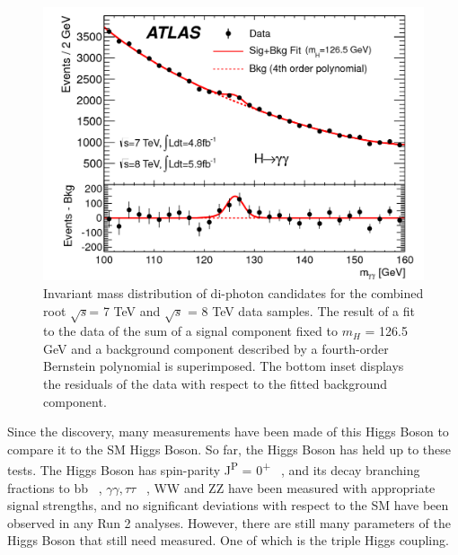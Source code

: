 \begin{figure}[h]
\begin{center}
\includegraphics[scale=0.25]{figures/higgs_disc}
\caption[Higgs boson mass peak]{Invariant mass distribution of di-photon candidates for the combined root $\sqrt{s}$= 7 TeV and $\sqrt{s}$ = 8 TeV data samples. The result of a fit to the data of the sum of a signal component fixed to $m_{H}$ = 126.5 GeV and a background component described by a fourth-order Bernstein polynomial is superimposed. The bottom inset displays the residuals of the data with respect to the fitted background component.}
\label{fig:Higgs}
\end{center}
\end{figure}

Since the discovery, many measurements have been made of this Higgs Boson to compare it to the SM Higgs Boson. So far, the Higgs Boson has held up to these tests. The Higgs Boson has spin-parity J\textsuperscript{P} = 0\textsuperscript{+} ~\cite{Aad:2013xqa}, and its decay branching fractions to bb ~\cite{Aaboud:2018zhk}, ${\gamma\gamma, \tau\tau}$ ~\cite{Aaboud:2018pen}, WW and ZZ have been measured with appropriate signal strengths, and no significant deviations with respect to the SM have been observed in any Run 2 analyses. However, there are still many parameters of the Higgs Boson that still need measured. One of which is the triple Higgs coupling.
